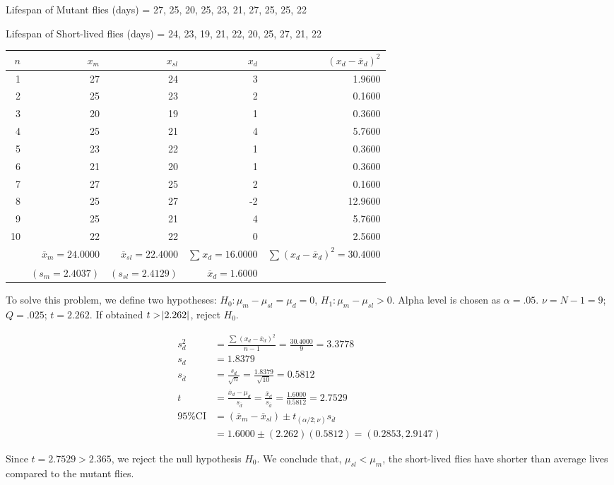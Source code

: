 \documentclass[onecolumn,10pt]{jhwhw}
\begin{document}
Lifespan of Mutant flies (days) = {27, 25, 20, 25, 23, 21, 27, 25, 25, 22}

Lifespan of Short-lived flies (days) = {24, 23, 19, 21, 22, 20, 25, 27, 21, 22}

\begin{center}
\begin{tabular}{r r r r r}
\toprule
$n$ & $x_m$ & $x_{sl}$ & $x_d$ & $(x_d - \overline{x}_d)^2$ \\
\midrule
1 & 27 & 24 & 3  &  1.9600 \\
2 & 25 & 23 & 2  &  0.1600 \\
3 & 20 & 19 & 1  &  0.3600 \\
4 & 25 & 21 & 4  &  5.7600 \\
5 & 23 & 22 & 1  &  0.3600 \\
6 & 21 & 20 & 1  &  0.3600 \\
7 & 27 & 25 & 2  &  0.1600 \\
8 & 25 & 27 & -2 & 12.9600 \\
9 & 25 & 21 & 4  &  5.7600 \\
10 & 22 & 22 & 0 &  2.5600 \\
\hline
\rule{0pt}{4ex} & $\overline{x}_m = 24.0000$ & $\overline{x}_{sl} = 22.4000$ & $\sum_{}^{} x_d = 16.0000 $ & $\sum_{}^{} (x_d - \overline{x}_d)^2 = 30.4000$ \\
\rule{0pt}{4ex}  & $(s_m = 2.4037)$ & $(s_{sl} = 2.4129)$ & $\overline{x}_d = 1.6000$ & \\
\bottomrule
\end{tabular}
\end{center}

To solve this problem, we define two hypotheses: $H_0: \mu_{m} - \mu_{sl} = \mu_d = 0$, $H_1: \mu_{m} - \mu_{sl} > 0$. Alpha level is chosen as $\alpha = .05$. $\nu = N - 1 = 9$; $Q = .025$; $t = 2.262$. If obtained $t > \abs{2.262}$, reject $H_0$.

\begin{equation*}
\begin{split}
s^2_d & = \frac{\sum_{}^{} (x_d - \overline{x}_d)^2}{n-1} = \frac{30.4000}{9} = 3.3778 \\
s_d & = 1.8379 \\
s_{\overline{d}} & = \frac{s_d}{\sqrt{n}} = \frac{1.8379}{\sqrt{10}} = 0.5812 \\
t & = \frac{\overline{x}_d - \mu_{d}}{s_{\overline{d}}} = \frac{\overline{x}_d}{s_{\overline{d}}} = \frac{1.6000}{0.5812} = 2.7529\\
%
\mbox{95\% CI} & = (\overline{x}_m - \overline{x}_{sl}) \pm t_{(\alpha/2;\nu)} s_{\overline{d}} \\
& = 1.6000 \pm (2.262) (0.5812) = (0.2853,2.9147)
\end{split}
\end{equation*}

Since $t = 2.7529 > 2.365$, we reject the null hypothesis $H_0$. We conclude that, $\mu_{sl} < \mu_{m}$, the short-lived flies have shorter than average lives compared to the mutant flies.
\end{document}
